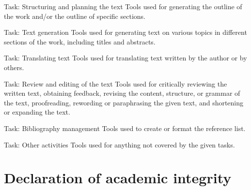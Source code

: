 \documentclass[11pt]{article}
\begin{document}
\begin{answerbox}{Task: Structuring and planning the text}
  Tools used for generating the outline of the work and/or the
  outline of specific sections.
\end{answerbox}

\vspace{.25em}

\begin{answerbox}{Task: Text generation}
  Tools used for generating text on various topics in different
  sections of the work, including titles and abstracts.
\end{answerbox}

\vspace{.25em}

\begin{answerbox}{Task: Translating text}
  Tools used for translating text written by the author or by others.
\end{answerbox}

\vspace{.25em}

\begin{answerbox}{Task: Review and editing of the text}
  Tools used for critically reviewing the written text, obtaining
  feedback, revising the content, structure, or grammar of the text,
  proofreading, rewording or paraphrasing the given text, and
  shortening or expanding the text.
\end{answerbox}

\vspace{.25em}

\begin{answerbox}{Task: Bibliography management}
  Tools used to create or format the reference list.
\end{answerbox}

\vspace{.25em}

\begin{answerbox}{Task: Other activities}
  Tools used for anything not covered by the given tasks.
\end{answerbox}

\clearpage

\section{Declaration of academic integrity}\label{sec:declaration}
\end{document}
